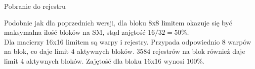 \begin{enumerate}[(a)]

\begin{minipage}[c]{\textwidth}

\item Pobranie do rejestru

\begin{center}
\begin{table}[H]
\centering
{}
\caption{Teoretyczna zajętość SM -- wersja 4. z pobraniem do rejestru.}
\end{table}
\end{center}

Podobnie jak dla poprzednich wersji, dla bloku 8x8 limitem okazuje się być maksymalna ilość bloków na SM, stąd zajętość $ 16 / 32 = 50\% $. \\
Dla macierzy 16x16 limitem są warpy i rejestry. Przypada odpowiednio $ 8 $ warpów na blok, co daje limit $ 4 $ aktywnych bloków. $ 3584 $ rejestrów na blok również daje limit $ 4 $ aktywnych bloków. Zajętość dla bloku 16x16 wynosi $ 100\% $. \\


\end{minipage}
\end{enumerate}
